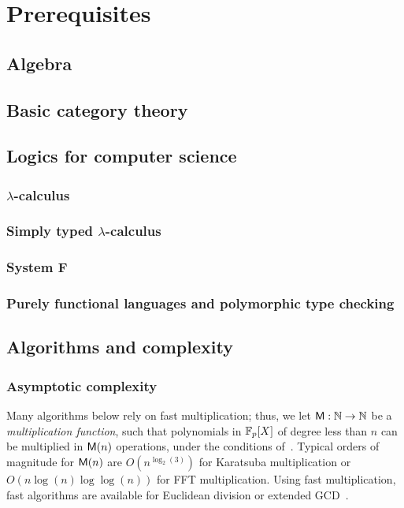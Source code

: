 

\part{Prerequisites}

\chapter{Algebra}
\label{cha:algebra}


\chapter{Basic category theory}
\label{cha:basic-categ-theory}


\chapter{Logics for computer science}
\label{cha:logics-comp-science}
\section{$\lambda$-calculus}
\label{sec:lambda-calculus}
\section{Simply typed $\lambda$-calculus}
\label{sec:simply-typed-lambda}
\section{System F}
\label{sec:system-f}
\section{Purely functional languages and polymorphic type checking}
\label{sec:purely-funct-lang}


\chapter{Algorithms and complexity}
\label{cha:algor-compl}
\section{Asymptotic complexity}
\label{sec:asympt-compl}
Many algorithms below rely on fast multiplication; thus, we let $\mathsf{M}
: \mathbb{N} \rightarrow \mathbb{N}$ be a {\em multiplication function}, such that
polynomials in $\mathbb{F}_p[X]$ of degree less than $n$ can be multiplied in
$\mathsf{M}(n)$ operations, under the conditions of~\cite[Ch.~8.3]{vzGG}.
Typical orders of magnitude for $\mathsf{M}(n)$ are $O(n^{\log_2(3)})$ for
Karatsuba multiplication or $O(n\log (n) \log\log (n))$ for FFT
multiplication. Using fast multiplication, fast algorithms are
available for Euclidean division or extended GCD~\cite[Ch.~9 \&
11]{vzGG}.

